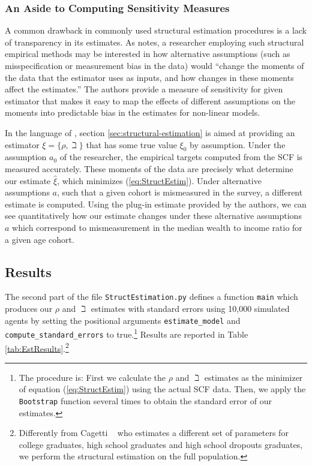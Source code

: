 \documentclass[titlepage, headings=optiontotocandhead]{Resources/texmf-local/tex/latex/econtex}
\begin{document}
\subsubsection{An Aside to Computing Sensitivity Measures}\label{subsubsec:sensmeas}


A common drawback in commonly used structural estimation procedures is a lack of transparency in its estimates.  As \cite{andrews2017measuring} notes, a researcher employing such structural empirical methods may be interested in how alternative assumptions (such as misspecification or measurement bias in the data) would ``change the moments of the data that the estimator uses as inputs, and how changes in these moments affect the estimates.'' The authors provide a measure of sensitivity for given estimator that makes it easy to map the effects of different assumptions on the moments into predictable bias in the estimates for non-linear models.

In the language of \cite{andrews2017measuring}, section \ref{sec:structural-estimation} is aimed at providing an estimator $\xi =\{\rho ,\beth\}$ that has some true value $\xi_0 $ by assumption. Under the assumption $a_0$ of the researcher, the empirical targets computed from the SCF is measured accurately. These moments of the data are precisely what determine our estimate $\hat{\xi}$, which minimizes (\ref{eq:StructEstim}). Under alternative assumptions $a$, such that a given cohort is mismeasured in the survey, a different estimate is computed. Using the plug-in estimate provided by the authors, we can see quantitatively how our estimate changes under these alternative assumptions $a$ which correspond to mismeasurement in the median wealth to income ratio for a given age cohort.

\subsection{Results}
The second part of the file \texttt{StructEstimation.py}
defines a function \texttt{main} which produces our $\rho$ and
$\beth$ estimates with standard errors using 10,000 simulated
agents by setting the positional arguments \texttt{estimate\_model} and
\texttt{compute\_standard\_errors} to true.\footnote{The procedure is: First we calculate the $\rho$ and
  $\beth$ estimates as the minimizer of equation
  (\ref{eq:StructEstim}) using the actual SCF data. Then, we apply the
  \texttt{Bootstrap} function several times to obtain the standard
  error of our estimates.} Results are reported in Table
\ref{tab:EstResults}.\footnote{Differently from Cagetti
  ~\citeyearpar{cagettiWprofiles} who estimates a different set of
  parameters for college graduates, high school graduates and high
  school dropouts graduates, we perform the structural estimation on
  the full population.}
\end{document}
